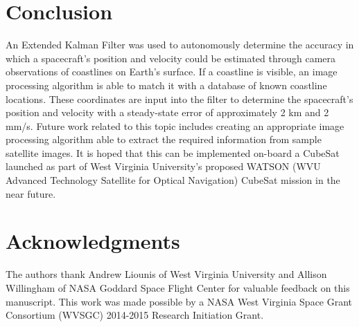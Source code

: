 \documentclass[]{aiaa-tc}%
\begin{document}
\section{Conclusion}
An Extended Kalman Filter was used to autonomously determine the accuracy in which a spacecraft's position and velocity could be estimated through camera observations of coastlines on Earth's surface.  If a coastline is visible, an image processing algorithm is able to match it with a database of known coastline locations.  These coordinates are input into the filter to determine the spacecraft's position and velocity with a steady-state error of approximately 2 km and 2 mm/s.  Future work related to this topic includes creating an appropriate image processing algorithm able to extract the required information from sample satellite images.  It is hoped that this can be implemented on-board a CubeSat launched as part of West Virginia University's proposed WATSON (WVU Advanced Technology Satellite for Optical Navigation) CubeSat mission in the near future.
%
\clearpage
\section{Acknowledgments}
The authors thank Andrew Liounis of West Virginia University and Allison Willingham of NASA Goddard Space Flight Center for valuable feedback on this manuscript. This work was made possible by a NASA West Virginia Space Grant Consortium (WVSGC) 2014-2015 Research Initiation Grant. 



\end{document}
